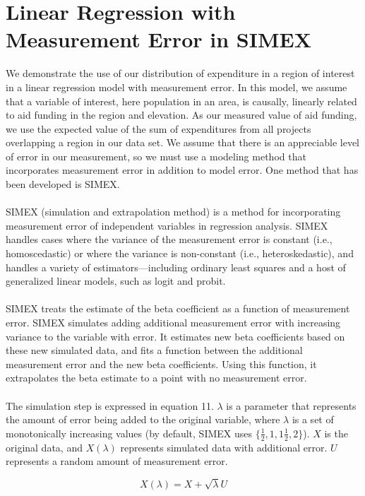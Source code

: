 \documentclass[12pt]{article}
\begin{document}
\section{Linear Regression with Measurement Error in SIMEX} \label{sec:simex}
We demonstrate the use of our distribution of expenditure in a region of interest in a linear regression model with measurement error. In this model, we assume that a variable of interest, here population in an area, is causally, linearly related to aid funding in the region and elevation. As our measured value of aid funding, we use the expected value of the sum of expenditures from all projects overlapping a region in our data set. We assume that there is an appreciable level of error in our measurement, so we must use a modeling method that incorporates measurement error in addition to model error. One method that has been developed is SIMEX.
\\ \\
\noindent SIMEX (simulation and extrapolation method) is a method for incorporating measurement error of independent variables in regression analysis.\cite{shortIntro} SIMEX handles cases where the variance of the measurement error is constant (i.e., homoscedastic) or where the variance is non-constant (i.e., heteroskedastic), and handles a variety of estimators---including ordinary least squares and a host of generalized linear models, such as logit and probit. \\
\\
SIMEX treats the estimate of the beta coefficient as a function of measurement error. SIMEX simulates adding additional measurement error with increasing variance to the variable with error. It estimates new beta coefficients based on these new simulated data, and fits a function between the additional measurement error and the new beta coefficients. Using this function, it extrapolates the beta estimate to a point with no measurement error. \\\\
The simulation step is expressed in equation 11. $\lambda$ is a parameter that represents the amount of error being added to the original variable, where $\lambda$ is a set of monotonically increasing values (by default, SIMEX uses $\{\frac{1}{2}, 1, 1\frac{1}{2}, 2\}$). $X$ is the original data, and $X(\lambda)$ represents simulated data with additional error. $U$ represents a random amount of measurement error. 

\begin{equation}
X(\lambda)=X+\sqrt{\lambda}U
\end{equation}
\end{document}
